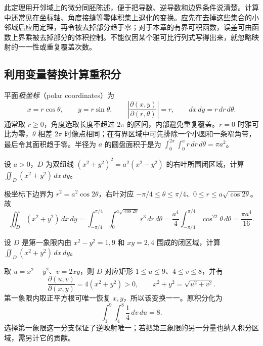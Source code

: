 \documentclass[UTF8,12pt,a4paper,fontset=fandol]{ctexbook}
\begin{document}
此定理用开邻域上的微分同胚陈述，便于把导数、逆导数和边界条件说清楚。计算中还常见在坐标轴、角度接缝等零体积集上退化的变换。应先在去掉这些集合的小邻域后应用定理，再令被去掉部分趋于零；对于本章的有界可积函数，误差可由函数上界乘被去掉部分的体积控制。不能仅因某个雅可比行列式写得出来，就忽略映射的一一性或重复覆盖次数。

\subsection{利用变量替换计算重积分}
\label{subsec:evaluating-multiple-integrals-by-change-of-variables}

平面\emph{极坐标}（polar coordinates）为
\begin{equation}
    x=r\cos\theta,\qquad y=r\sin\theta,\qquad
    \left|\frac{\partial(x,y)}{\partial(r,\theta)}\right|=r,
    \qquad dx\,dy=r\,dr\,d\theta.
    \label{eq:multiple-polar-coordinates}
\end{equation}
通常取 $r\geq0$，角度选取长度不超过 $2\pi$ 的区间，内部避免重复覆盖。$r=0$ 时雅可比为零，$\theta$ 相差 $2\pi$ 时像点相同；在有界区域中可先排除一个小圆和一条窄角带，最后令其面积趋于零。半径为 $a$ 的圆盘面积于是为 $\int_0^{2\pi}\int_0^ar\,dr\,d\theta=\pi a^2$。

\begin{example}
\label{ex:multiple-lemniscate-integral}
设 $a>0$，$D$ 为双纽线 $(x^2+y^2)^2=a^2(x^2-y^2)$ 的右叶所围闭区域，计算 $\iint_D(x^2+y^2)\,dx\,dy$。
\end{example}
\begin{solve}
极坐标下边界为 $r^2=a^2\cos2\theta$，右叶对应 $-\pi/4\leq\theta\leq\pi/4$、$0\leq r\leq a\sqrt{\cos2\theta}$。故
\[
    \iint_D(x^2+y^2)\,dx\,dy
    =\int_{-\pi/4}^{\pi/4}\int_0^{a\sqrt{\cos2\theta}}r^3\,dr\,d\theta
    =\frac{a^4}{4}\int_{-\pi/4}^{\pi/4}\cos^22\theta\,d\theta
    =\frac{\pi a^4}{16}.
\]
\end{solve}

\begin{example}
\label{ex:multiple-hyperbolic-substitution}
设 $D$ 是第一象限内由 $x^2-y^2=1,9$ 和 $xy=2,4$ 围成的闭区域，计算 $\iint_D(x^2+y^2)\,dx\,dy$。
\end{example}
\begin{solve}
取 $u=x^2-y^2$、$v=2xy$，则 $D$ 对应矩形 $1\leq u\leq9$、$4\leq v\leq8$，并有
\[
    \frac{\partial(u,v)}{\partial(x,y)}=4(x^2+y^2)>0,\qquad
    x^2+y^2=\sqrt{u^2+v^2}.
\]
第一象限内取正平方根可唯一恢复 $x,y$，所以该变换一一。原积分化为
\[
    \int_1^9\int_4^8\frac14\,dv\,du=8.
\]
选择第一象限这一分支保证了逆映射唯一；若把第三象限的另一分量也纳入积分区域，需另计它的贡献。
\end{solve}
\end{document}
